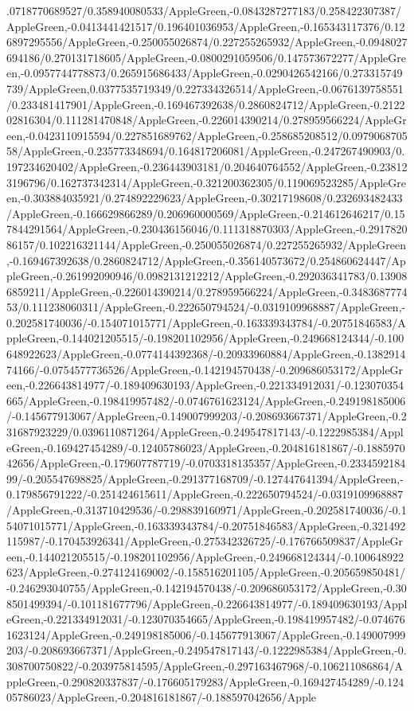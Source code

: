 {\begin{tikzternal}
{.0718770689527/0.358940080533/AppleGreen,-0.0843287277183/0.258422307387/AppleGreen,-0.0413441421517/0.196401036953/AppleGreen,-0.165343117376/0.126897295556/AppleGreen,-0.250055026874/0.227255265932/AppleGreen,-0.0948027694186/0.270131718605/AppleGreen,-0.0800291059506/0.147573672277/AppleGreen,-0.0957744778873/0.265915686433/AppleGreen,-0.0290426542166/0.273315749739/AppleGreen,0.0377535719349/0.227334326514/AppleGreen,-0.0676139758551/0.233481417901/AppleGreen,-0.169467392638/0.2860824712/AppleGreen,-0.212202816304/0.111281470848/AppleGreen,-0.226014390214/0.278959566224/AppleGreen,-0.0423110915594/0.227851689762/AppleGreen,-0.258685208512/0.097906870558/AppleGreen,-0.235773348694/0.164817206081/AppleGreen,-0.247267490903/0.197234620402/AppleGreen,-0.236443903181/0.204640764552/AppleGreen,-0.238123196796/0.162737342314/AppleGreen,-0.321200362305/0.119069523285/AppleGreen,-0.303884035921/0.274892229623/AppleGreen,-0.30217198608/0.232693482433/AppleGreen,-0.166629866289/0.206960000569/AppleGreen,-0.214612646217/0.157844291564/AppleGreen,-0.230436156046/0.111318870303/AppleGreen,-0.291782086157/0.102216321144/AppleGreen,-0.250055026874/0.227255265932/AppleGreen,-0.169467392638/0.2860824712/AppleGreen,-0.356140573672/0.254860624447/AppleGreen,-0.261992090946/0.0982131212212/AppleGreen,-0.292036341783/0.139086859211/AppleGreen,-0.226014390214/0.278959566224/AppleGreen,-0.348368777453/0.111238060311/AppleGreen,-0.222650794524/-0.0319109968887/AppleGreen,-0.202581740036/-0.154071015771/AppleGreen,-0.163339343784/-0.20751846583/AppleGreen,-0.144021205515/-0.198201102956/AppleGreen,-0.249668124344/-0.100648922623/AppleGreen,-0.0774144392368/-0.20933960884/AppleGreen,-0.138291474166/-0.0754577736526/AppleGreen,-0.142194570438/-0.209686053172/AppleGreen,-0.226643814977/-0.189409630193/AppleGreen,-0.221334912031/-0.123070354665/AppleGreen,-0.198419957482/-0.0746761623124/AppleGreen,-0.249198185006/-0.145677913067/AppleGreen,-0.149007999203/-0.208693667371/AppleGreen,-0.231687923229/0.0396110871264/AppleGreen,-0.249547817143/-0.1222985384/AppleGreen,-0.169427454289/-0.12405786023/AppleGreen,-0.204816181867/-0.188597042656/AppleGreen,-0.179607787719/-0.0703318135357/AppleGreen,-0.233459218499/-0.205547698825/AppleGreen,-0.291377168709/-0.127447641394/AppleGreen,-0.179856791222/-0.251424615611/AppleGreen,-0.222650794524/-0.0319109968887/AppleGreen,-0.313710429536/-0.298839160971/AppleGreen,-0.202581740036/-0.154071015771/AppleGreen,-0.163339343784/-0.20751846583/AppleGreen,-0.321492115987/-0.170453926341/AppleGreen,-0.275342326725/-0.176766509837/AppleGreen,-0.144021205515/-0.198201102956/AppleGreen,-0.249668124344/-0.100648922623/AppleGreen,-0.274124169002/-0.158516201105/AppleGreen,-0.205659850481/-0.246293040755/AppleGreen,-0.142194570438/-0.209686053172/AppleGreen,-0.308501499394/-0.101181677796/AppleGreen,-0.226643814977/-0.189409630193/AppleGreen,-0.221334912031/-0.123070354665/AppleGreen,-0.198419957482/-0.0746761623124/AppleGreen,-0.249198185006/-0.145677913067/AppleGreen,-0.149007999203/-0.208693667371/AppleGreen,-0.249547817143/-0.1222985384/AppleGreen,-0.308700750822/-0.203975814595/AppleGreen,-0.297163467968/-0.106211086864/AppleGreen,-0.290820337837/-0.176605179283/AppleGreen,-0.169427454289/-0.12405786023/AppleGreen,-0.204816181867/-0.188597042656/Apple}
\end{tikzternal}}
